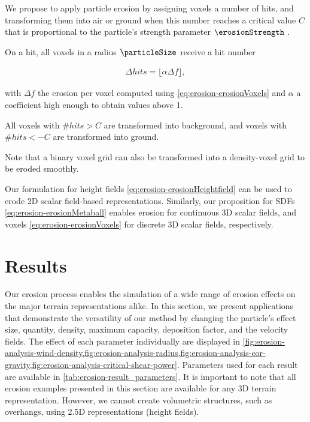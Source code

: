 We propose to apply particle erosion by assigning voxels a number of hits, and transforming them into air or ground when this number reaches a critical value $C$ that is proportional to the particle's strength parameter $\erosionStrength$ \cite{Jones2010}. 

On a hit, all voxels in a radius $\particleSize$ receive a hit number 

\begin{align}
    \label{eq:erosion-erosionDiscreteVoxels}
    \Delta hits = \lfloor \alpha \Delta f \rfloor,
\end{align}

with $\Delta f$ the erosion per voxel computed using \eqref{eq:erosion-erosionVoxels} and $\alpha$ a coefficient high enough to obtain values above 1. 

All voxels with $\# hits > C$ are transformed into background, and voxels with $\# hits < -C$ are transformed into ground.

Note that a binary voxel grid can also be transformed into a density-voxel grid to be eroded smoothly.

Our formulation for height fields \eqref{eq:erosion-erosionHeightfield} can be used to erode 2D scalar field-based representations. Similarly,  
our proposition for SDFs \eqref{eq:erosion-erosionMetaball} enables erosion for continuous 3D scalar fields, and voxels \eqref{eq:erosion-erosionVoxels} for discrete 3D scalar fields, respectively.


\section{Results}
\label{sec:erosion-erosion-examples}

Our erosion process enables the simulation of a wide range of erosion effects on the major terrain representations alike. In this section, we present applications that demonstrate the versatility of our method by changing the particle's effect size, quantity, density, maximum capacity, deposition factor, and the velocity fields. The effect of each parameter individually are displayed in \cref{fig:erosion-analysis-wind-density,fig:erosion-analysis-radius,fig:erosion-analysis-cor-gravity,fig:erosion-analysis-critical-shear-power}. Parameters used for each result are available in \cref{tab:erosion-result_parameters}.  
It is important to note that all erosion examples presented in this section are available for any 3D terrain representation. However, we cannot create volumetric structures, such as overhangs, using 2.5D representations (height fields).

